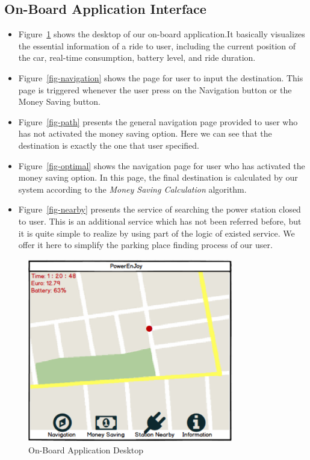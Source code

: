 \documentclass[a4paper,11pt]{article}
\begin{document}
	\subsection{On-Board Application Interface}
	\begin{itemize}
	\item Figure~\ref{fig-desk} shows the desktop of our on-board application.It basically visualizes the essential information of a ride to user, including the current position of the car, real-time consumption, battery level, and ride duration. 
	\item Figure~\ref{fig-navigation} shows the page for user to input the destination. This page is triggered whenever the user press on the Navigation button or the Money Saving button.
	\item Figure~\ref{fig-path} presents the general navigation page provided to user who has not activated the money saving option. Here we can see that the destination is exactly the one that user specified.
	\item Figure~\ref{fig-optimal} shows the navigation page for user who has activated the money saving option. In this page, the final destination is calculated by our system according to the \textsl{Money Saving Calculation} algorithm.
	\item Figure~\ref{fig-nearby} presents the service of searching the power station closed to user. This is an additional service which has not been referred before, but it is quite simple to realize by using part of the logic of existed service. We offer it here to simplify the parking place finding process of our user. 
	\end{itemize}
	\begin{figure}[h]
   			\centering
   			\includegraphics[width=0.8\textwidth]{images/desk}
  	    		\caption{On-Board Application Desktop}\label{fig-desk}
	\end{figure}
\end{document}
